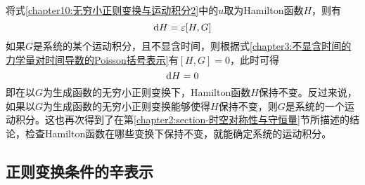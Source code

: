 将式\eqref{chapter10:无穷小正则变换与运动积分2}中的$u$取为Hamilton函数$H$，则有
\begin{equation}
	\mathrm{d} H = \varepsilon [H,G]
\end{equation}
如果$G$是系统的某个运动积分，且不显含时间，则根据式\eqref{chapter3:不显含时间的力学量对时间导数的Poisson括号表示}有$[H,G]=0$，此时可得
\begin{equation*}
	\mathrm{d} H = 0
\end{equation*}
即在以$G$为生成函数的无穷小正则变换下，Hamilton函数$H$保持不变。反过来说，如果以$G$为生成函数的无穷小正则变换能够使得$H$保持不变，则$G$是系统的一个运动积分。这也再次得到了在第\ref{chapter2:section-时空对称性与守恒量}节所描述的结论，检查Hamilton函数在哪些变换下保持不变，就能确定系统的运动积分。

\subsection{正则变换条件的辛表示}\label{chapter10:subsection-正则变换条件的辛表示}

